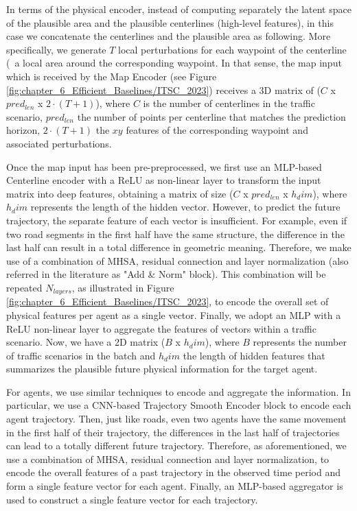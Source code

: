 In terms of the physical encoder, instead of computing separately the latent space of the plausible area and the plausible centerlines (high-level features), in this case we concatenate the centerlines and the plausible area as following. More specifically, we generate $T$ local perturbations for each waypoint of the centerline (\ie \ a local area around the corresponding waypoint. In that sense, the map input which is received by the Map Encoder (see Figure \ref{fig:chapter_6_Efficient_Baselines/ITSC_2023}) receives a 3D matrix of ($C$ x $pred_{len}$ x $2 \cdot (T+1)$), where $C$ is the number of centerlines in the traffic scenario, $pred_{len}$ the number of points per centerline that matches the prediction horizon, $2 \cdot (T+1)$ the $xy$ features of the corresponding waypoint and associated perturbations. 

Once the map input has been pre-preprocessed, we first use an \ac{MLP}-based Centerline encoder with a \ac{ReLU} as non-linear layer to transform the input matrix into deep features, obtaining a matrix of size ($C$ x $pred_{len}$ x $h_dim$), where $h_dim$ represents the length of the hidden vector. However, to predict the future trajectory, the separate feature of each vector is insufficient. For example, even if two road segments in the first half have the same structure, the difference in the last half can result in a total difference in geometric meaning. Therefore, we make use of a combination of \ac{MHSA}, residual connection and layer normalization (also referred in the literature as "Add \& Norm" block). This combination will be repeated $N_{layers}$, as illustrated in Figure \ref{fig:chapter_6_Efficient_Baselines/ITSC_2023}, to encode the overall set of physical features per agent as a single vector. Finally, we adopt an \ac{MLP} with a \ac{ReLU} non-linear layer to aggregate the features of vectors within a traffic scenario. Now, we have a 2D matrix ($B$ x $h_dim$), where $B$ represents the number of traffic scenarios in the batch and $h_dim$ the length of hidden features that summarizes the plausible future physical information for the target agent.

For agents, we use similar techniques to encode and aggregate the information. In particular, we use a \ac{CNN}-based Trajectory Smooth Encoder block to encode each agent trajectory. Then, just like roads, even two agents have the same movement in the first half of their trajectory, the differences in the last half of trajectories can lead to a totally different future trajectory. Therefore, as aforementioned, we use a combination of \ac{MHSA}, residual connection and layer normalization, to encode the overall features of a past trajectory in the observed time period and form a single feature vector for each agent. Finally, an \ac{MLP}-based aggregator is used to construct a single feature vector for each trajectory.

